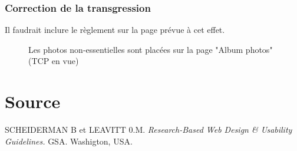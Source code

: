 \documentclass{article}[12pt]
\begin{document}
     \subsubsection*{Correction de la transgression}
    Il faudrait inclure le règlement sur la page prévue à cet effet.
     \begin{figure}[H]
     	\centering
     	\caption{Les photos non-essentielles sont placées sur la page "Album photos" (TCP en vue)}
     \end{figure}

    \section{Source}

    SCHEIDERMAN B et LEAVITT 0.M. \textit{Research-Based Web Design \& Usability Guidelines.} GSA.  Washigton, USA.
    
\end{document}
